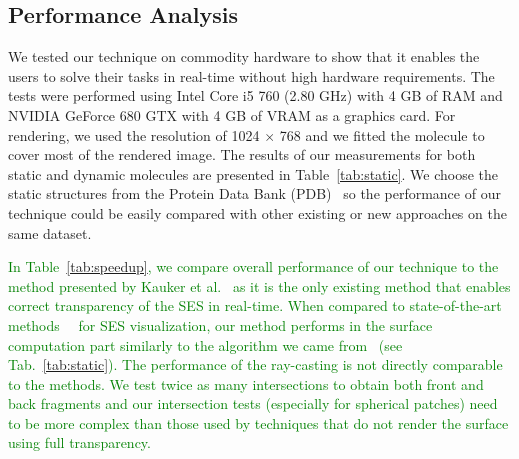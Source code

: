 \subsection{Performance Analysis}
\label{sec:performance}

We tested our technique on commodity hardware to show that it enables the users to solve their tasks in real-time without high hardware requirements.
The tests were performed using Intel Core i5 760 (2.80 GHz) with 4 GB of RAM and NVIDIA GeForce 680 GTX with 4 GB of VRAM as a graphics card.
For rendering, we used the resolution of 1024 $\times$ 768 and we fitted the molecule to cover most of the rendered image.
The results of our measurements for both static and dynamic molecules are presented in Table~\ref{tab:static}.
We choose the static structures from the Protein Data Bank (PDB)~\cite{sussman1998protein} so the performance of our technique could be easily compared with other existing or new approaches on the same dataset.

\textcolor{green}{
In Table~\ref{tab:speedup}, we compare overall performance of our technique to the method presented by Kauker et al.~\cite{kauker2013rendering} as it is the only existing method that enables correct transparency of the SES in real-time.
When compared to state-of-the-art methods~\cite{lindow2010accelerated}~\cite{krone2011parallel} for SES visualization, our method performs in the surface computation part similarly to the algorithm we came from~\cite{krone2011parallel} (see Tab.~\ref{tab:static}).
The performance of the ray-casting is not directly comparable to the methods.
We test twice as many intersections to obtain both front and back fragments and our intersection tests (especially for spherical patches) need to be more complex than those used by techniques that do not render the surface using full transparency.
}

\setlength{\tabcolsep}{4.5pt}

